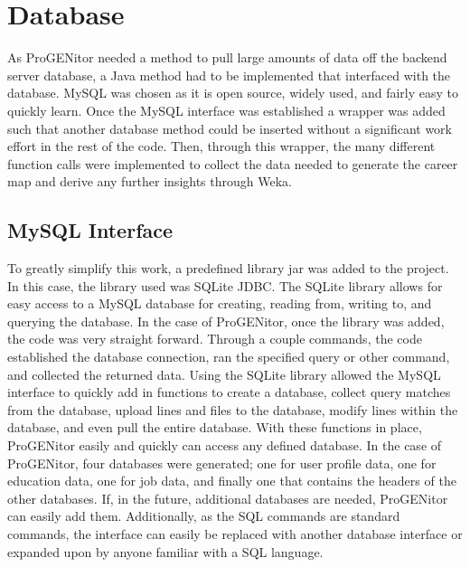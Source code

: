 \section{Database}
\label{sect:database}
As ProGENitor needed a method to pull large amounts of data off the backend
server database, a Java method had to be implemented that interfaced with
the database.  MySQL was chosen as it is open source, widely used, and fairly
easy to quickly learn.  Once the MySQL interface was established a wrapper was
added such that another database method could be inserted without a significant
work effort in the rest of the code.  Then, through this wrapper, the many
different function calls were implemented to collect the data needed to generate
the career map and derive any further insights through Weka.

\subsection{MySQL Interface}
To greatly simplify this work, a predefined library jar was added
to the project.  In this case, the library used was SQLite JDBC.  The SQLite
library allows for easy access to a MySQL database for creating, reading from,
writing to, and querying the database.  In the case of ProGENitor, once the
library was added, the code was very straight forward.  Through a couple
commands, the code established the database connection, ran the specified query
or other command, and collected the returned data.\cite{sqlite}  Using the
SQLite library allowed the MySQL interface to quickly add in functions to create
a database, collect query matches from the database, upload lines and files to
the database, modify lines within the database, and even pull the entire
database.  With these functions in place, ProGENitor easily and quickly can
access any defined database.  In the case of ProGENitor, four databases were
generated; one for user profile data, one for education data, one for job data,
and finally one that contains the headers of the other databases.  If, in the
future, additional databases are needed, ProGENitor can easily add them. 
Additionally, as the SQL commands are standard commands, the interface can
easily be replaced with another database interface or expanded upon by anyone
familiar with a SQL language.

